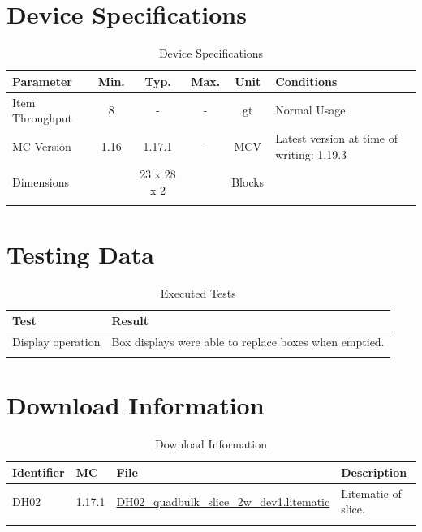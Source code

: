 \documentclass[10pt]{datasheet}
\begin{document}
\onecolumn

\section{Device Specifications}

\begin{table}[h]
    \caption{Device Specifications}
    \begin{tabularx}{\textwidth}{l | c c c | c | X}
        \thickhline
        \textbf{Parameter} & \textbf{Min.} & \textbf{Typ.} & \textbf{Max.} &
        \textbf{Unit} & \textbf{Conditions} \\
        \hline
        Item Throughput  & 8 & - & - & gt & Normal Usage \\
        \hline
        MC Version & 1.16 & 1.17.1 & - & MCV & Latest version at time of writing: 1.19.3\\
        \hline
        Dimensions & & 23 x 28 x 2 & & Blocks & \\
        \thickhline
\end{tabularx}
\end{table}
\newpage
\section{Testing Data}
\begin{table}[h]
\caption{Executed Tests}
\begin{tabularx}{\textwidth}{l | X}
    \thickhline
    \textbf{Test} & \textbf{Result} \\
    \hline
    Display operation & Box displays were able to replace boxes when emptied. \\
    \thickhline
\end{tabularx}
\end{table}

\section{Download Information}
\begin{table}[h]
    \caption{Download Information}
    \begin{tabularx}{\textwidth}{l | l | l | X}
        \thickhline
        \textbf{Identifier} & \textbf{MC} & \textbf{File} & \textbf{Description} \\
        \hline
        DH02 & 1.17.1 & \href{https://github.com/Soontech-Annals/Archive/blob/364bde8dbcbc2e5337489ff435bcda9b387017e2/Archive/display-halls/DH02\%20Quad\%20Display\%20Slice\%20With\%20Passive\%20Read/DH02\_quadbulk\_slice\_2w\_dev1.litematic?raw=1}{DH02\_quadbulk\_slice\_2w\_dev1.litematic} & Litematic of slice. \\
        \hline
        \thickhline
    \end{tabularx}
\end{table}
\end{document}

